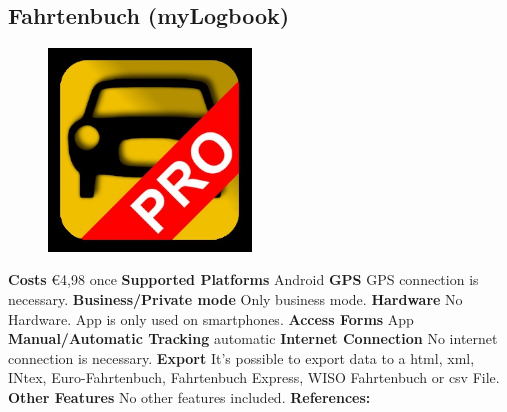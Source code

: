 \begin{singlespace}
\section{Fahrtenbuch (myLogbook)}
\begin{figure}
  \begin{center}
    \includegraphics[width=0.48\textwidth]{bilder/fahrtenbuch2}
  \end{center}
\end{figure}
\textbf{Costs} \euro 4,98 once
\newline\newline
\textbf{Supported Platforms} Android 
\newline\newline
\textbf{GPS} GPS connection is necessary.
\newline\newline
\textbf{Business/Private mode} Only business mode.
\newline\newline
\textbf{Hardware} No Hardware. App is only used on smartphones.
\newline\newline
\textbf{Access Forms} App
\newline\newline
\textbf{Manual/Automatic Tracking} automatic
\newline\newline
\textbf{Internet Connection} No internet connection is necessary.
\newline\newline
\textbf{Export} It’s possible to export data to a \gls{html}, \gls{xml}, INtex, Euro-Fahrtenbuch, Fahrtenbuch Express, WISO Fahrtenbuch or \gls{csv} File.
\newline\newline
\textbf{Other Features} No other features included.
\newline\newline
\textbf{References:} \cite{Fahrtenbuch_myLogbook}
\newpage
\clearpageauthor

\end{singlespace}
